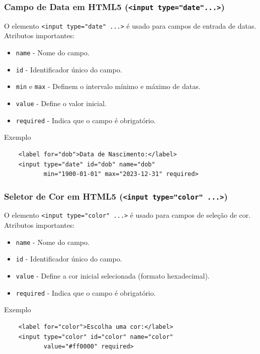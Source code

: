 \documentclass{beamer}
\begin{document}
\begin{frame}[fragile]
  \frametitle{Campo de Data em HTML5 (\texttt{<input type="date"...>})}

  O elemento \texttt{<input type="date" ...>} é usado para campos de entrada de datas. Atributos importantes:

  \begin{itemize}
    \item \texttt{name} - Nome do campo.
    \item \texttt{id} - Identificador único do campo.
    \item \texttt{min} e \texttt{max} - Definem o intervalo mínimo e máximo de datas.
    \item \texttt{value} - Define o valor inicial.
    \item \texttt{required} - Indica que o campo é obrigatório.
  \end{itemize}

  \begin{block}{Exemplo}
    \begin{verbatim}
    <label for="dob">Data de Nascimento:</label>
    <input type="date" id="dob" name="dob"
           min="1900-01-01" max="2023-12-31" required>
    \end{verbatim}
  \end{block}
\end{frame}


\begin{frame}[fragile]
  \frametitle{Seletor de Cor em HTML5 (\texttt{<input type="color" ...>})}

  O elemento \texttt{<input type="color" ...>} é usado para campos de seleção de cor. Atributos importantes:

  \begin{itemize}
    \item \texttt{name} - Nome do campo.
    \item \texttt{id} - Identificador único do campo.
    \item \texttt{value} - Define a cor inicial selecionada (formato hexadecimal).
    \item \texttt{required} - Indica que o campo é obrigatório.
  \end{itemize}

  \begin{block}{Exemplo}
    \begin{verbatim}
    <label for="color">Escolha uma cor:</label>
    <input type="color" id="color" name="color"
           value="#ff0000" required>
    \end{verbatim}
  \end{block}
\end{frame}
\end{document}
